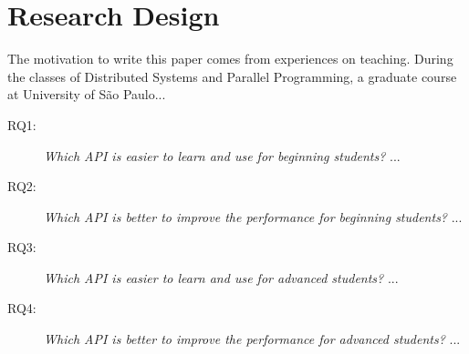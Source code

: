 \section{Research Design}
\label{sec:researchdesing}

The motivation to write this paper comes from experiences on teaching. During the classes of Distributed Systems and Parallel Programming, a graduate course at University of São Paulo...

\begin{description}
\item[RQ1:] \textit{Which API is easier to learn and use for beginning students?}
%
...
\item[RQ2:] \textit{Which API is better to improve the performance for beginning students?}
%
...
\item[RQ3:] \textit{Which API is easier to learn and use for advanced students?}
%
...
\item[RQ4:] \textit{Which API is better to improve the performance for advanced students?}
%
...

\end{description}	

